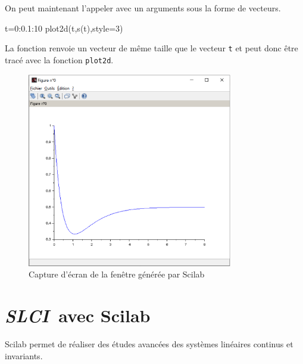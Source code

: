On peut maintenant l'appeler avec un arguments sous la forme de vecteurs. 
\begin{Scilabcode}
t=0:0.1:10
plot2d(t,s(t),style=3)
\end{Scilabcode}
La fonction renvoie un vecteur de même taille que le vecteur \verb?t? et peut
donc être tracé avec la fonction \verb?plot2d?.
\begin{figure}[!hb]
    \centering
    \includegraphics[width=0.8\textwidth]{fig/capture_SCILAB-fonction.eps}
    \caption{Capture d'écran de la fenêtre générée par Scilab}
\end{figure}
\clearpage
\section{\emph{{\scshape SLCI}}~avec Scilab}

Scilab permet de réaliser des études avancées des systèmes linéaires continus 
et invariants.

